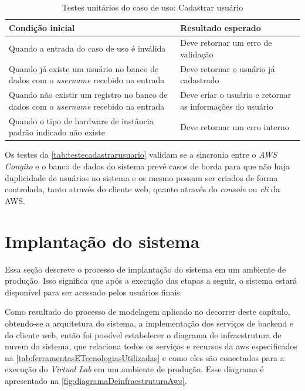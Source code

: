 \begin{table}[h]
\caption{Testes unitários do caso de uso: Cadastrar usuário}
\label{tab:testecadastrarusuario}
\begin{tabularx}{\textwidth}{p{} p{}}
\toprule
\textbf{Condição inicial} & \textbf{Resultado esperado} \\ \midrule

Quando a entrada do caso de uso é inválida & Deve retornar um erro de validação \\ \hline

Quando já existe um usuário no banco de dados com o \textit{username} recebido na entrada & Deve retornar o usuário já cadastrado \\ \hline

Quando não existir um registro no banco de dados com o \textit{username} recebido na entrada & Deve criar o usuário e retornar as informações do usuário \\

Quando o tipo de hardware de instância padrão indicado não existe & Deve retornar um erro interno \\

\bottomrule
\end{tabularx}
\end{table}

Os testes da \autoref{tab:testecadastrarusuario} validam se a sincronia entre o \textit{AWS Congito} e o banco de dados do sistema prevê casos de borda para que não haja duplicidade de usuários no sistema e os mesmo possam ser criados de forma controlada, tanto através do cliente web, quanto através do \textit{console} ou \textit{cli} da AWS.

\section{Implanta\c{c}\~ao do sistema}
\label{sec:implantacaoDoSistema}

Essa seção descreve o processo de implantação do sistema em um ambiente de produção. Isso significa que após a execução das etapas a seguir, o sistema estará disponível para ser acessado pelos usuários finais.

Como resultado do processo de modelagem aplicado no decorrer deste capítulo, obtendo-se a arquitetura do sistema, a implementação dos serviços de backend e do cliente web, então foi possível estabelecer o diagrama de infraestrutura de nuvem do sistema, que relaciona todos os serviços e recursos da \gls{aws} especificados na \autoref{tab:ferramentasETecnologiasUtilizadas} e como eles são conectados para a execução do \textit{Virtual Lab} em um ambiente de produção. Esse diagrama é apresentado na \autoref{fig:diagramaDeinfraestruturaAws}.

